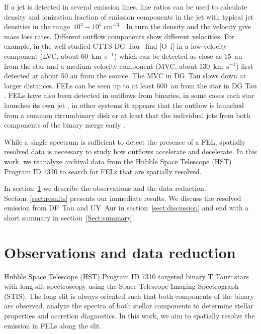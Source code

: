 \documentclass[twocolumn,trackchanges]{aastex63}
\begin{document}
If a
jet is detected in several emission lines, line ratios can be used to
calculate density and ionization fraction of emission components in the
jet with typical jet densities in the range~$10^3-10^5\;\mathrm{cm}^{-3}$
\citep[e.g.][]{1993ApJ...410L..31S,1999A&A...342..717B,2000A&A...356L..41L,2013A&A...550L...1S}. In turn
the density and the velocity give mass loss rates. Different outflow
components show different velocities. For example, in the well-studied
CTTS DG Tau~\citet{2013A&A...550L...1S} find [O~{\sc i}] in a low-velocity
component (LVC, about 60~km~s$^{-1}$) which can be detected as
close as 15~au from the star and a medium-velocity component (MVC, about
130~km~s$^{-1}$) first detected at about 50 au from the source. The MVC in DG~Tau
slows down at larger distances. 
FELs can be seen up to at least 600~au from the
star in DG Tau \citep{1993ApJ...410L..31S}. FELs have also been detected in outflows from
binaries, in some cases each star launches its own jet \citep[e.g.\ in
  T~Tau][]{1999ApJ...523..709S}, in other systems it appears that the outflow
is launched from a common circumbinary disk or at least that the individual
jets from both components of the binary merge early \citep{2010ApJ...708L...5M}. 

While a single spectrum is sufficient to
detect the presence of a FEL, spatially resolved data is necessary to study
how outflows accelerate and decelerate. In this work, we reanalyze
archival data from the Hubble Space Telescope (HST) Program ID 7310 to
search for FELs that are spatially resolved.

In section~\ref{sect:obs} we describe the observations and the data reduction. Section~\ref{sect:results} presents our immediate results. We discuss the resolved emission from DF~Tau and UY~Aur in section~\ref{sect:discussion} and end with a short summary in section~\ref{Sect:summary}.

\section{Observations and data reduction}
\label{sect:obs}



Hubble Space Telescope (HST) Program ID 7310 targeted binary T Tauri
stars with long-slit spectroscopy using the Space Telescope Imaging
Spectrograph (STIS). The long slit is always oriented such that both
components of the binary are observed. \citet{2003ApJ...583..334H} analyze the
spectra of both stellar components to determine stellar properties and
accretion diagnostics. In this work, we aim to spatially resolve the
emission in FELs along the slit.
\end{document}
